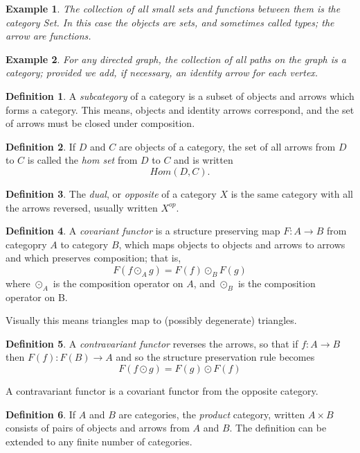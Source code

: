 \documentclass[oneside]{book}
\theoremstyle{plain}
\newtheorem{example}{Example}
\theoremstyle{definition}
\newtheorem{definition}{Definition}
\theoremstyle{plain}
\def\Hom{\mathit{Hom}}
\begin{document}
\begin{example}
The collection of all small sets and functions between them is 
the category {\em Set}.  In this case the objects are sets,
and sometimes called types; the arrow are functions.
\end{example}

\begin{example}
For any directed graph, the collection of
all paths on the graph is a category; provided we add, if necessary, an identity
arrow for each vertex.
\end{example}

\begin{definition}
A {\em subcategory} of a category is a subset of objects and arrows
which forms a category. This means, objects and identity arrows
correspond, and the set of arrows must be closed under composition.
\end{definition}

\begin{definition}
If $D$ and $C$ are objects of a category, the set of all arrows 
from $D$ to $C$ is called the {\em hom set} from $D$ to $C$
and is written
$$\Hom(D,C).$$
\end{definition}

\begin{definition}
The {\em dual}, or {\em opposite} of a category $X$ is the same
category with all the arrows reversed, usually written $X^{\mathit{op}}$.
\end{definition}

\begin{definition}
A {\em covariant functor} is a structure preserving map
$F:A\rightarrow B$ from
categopry $A$ to category $B$, which maps objects to objects and
arrows to arrows and which preserves composition; that is,
$$F(f\odot_A g) = F(f) \odot_B F(g)$$
where $\odot_A$ is the composition operator on $A$, 
and $\odot_B$ is the composition operator on B.
\end{definition}
Visually this means triangles map to (possibly degenerate) triangles.

\begin{definition}
A {\em contravariant functor} reverses the arrows, so that
if $f:A\rightarrow B$ then $F(f):F(B)\rightarrow A$ and so
the structure preservation rule becomes 
$$F(f\odot g) = F(g) \odot F(f)$$
\end{definition}
A contravariant functor is a covariant functor from the opposite
category.

\begin{definition}
If $A$ and $B$ are categories, the {\em product} category, written $A\times B$
consists of pairs of objects and arrows from $A$ and $B$. The definition
can be extended to any finite number of categories.
\end{definition}
\end{document}
